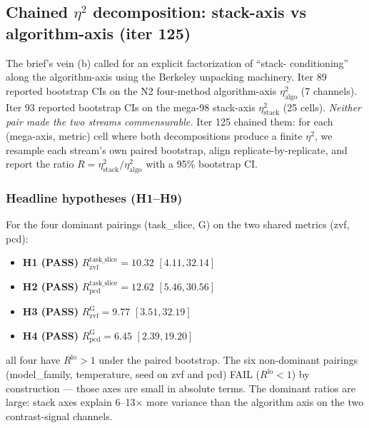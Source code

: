 \subsection{Chained $\eta^2$ decomposition: stack-axis vs algorithm-axis (iter 125)}
\label{sec:p5-iter125-chained-eta2}

The brief's vein (b) called for an explicit factorization of ``stack-
conditioning'' along the algorithm-axis using the Berkeley unpacking
machinery. Iter 89 reported bootstrap CIs on the N2 four-method
algorithm-axis $\eta^2_{\mathrm{algo}}$ (7 channels). Iter 93 reported
bootstrap CIs on the mega-98 stack-axis $\eta^2_{\mathrm{stack}}$ (25
cells). \emph{Neither pair made the two streams commensurable.} Iter 125
chained them: for each (mega-axis, metric) cell where both
decompositions produce a finite $\eta^2$, we resample each stream's
own paired bootstrap, align replicate-by-replicate, and report the
ratio $R = \eta^2_{\mathrm{stack}} / \eta^2_{\mathrm{algo}}$ with a 95\%
bootstrap CI.

\subsubsection{Headline hypotheses (H1--H9)}
\label{sec:p5-iter125-headlines}
For the four dominant pairings (task\_slice, G) on the two shared
metrics (zvf, pcd):
\begin{itemize}
\item \textbf{H1 (PASS)} $R_{\mathrm{zvf}}^{\mathrm{task\_slice}} = 10.32$ $[4.11, 32.14]$
\item \textbf{H2 (PASS)} $R_{\mathrm{pcd}}^{\mathrm{task\_slice}} = 12.62$ $[5.46, 30.56]$
\item \textbf{H3 (PASS)} $R_{\mathrm{zvf}}^{\mathrm{G}} = 9.77$ $[3.51, 32.19]$
\item \textbf{H4 (PASS)} $R_{\mathrm{pcd}}^{\mathrm{G}} = 6.45$ $[2.39, 19.20]$
\end{itemize}
all four have $R^{\mathrm{lo}} > 1$ under the paired bootstrap. The
six non-dominant pairings (model\_family, temperature, seed on zvf
and pcd) FAIL ($R^{\mathrm{lo}} < 1$) by construction --- those axes
are small in absolute terms. The dominant ratios are large: stack
axes explain 6--13$\times$ more variance than the algorithm axis on
the two contrast-signal channels.


